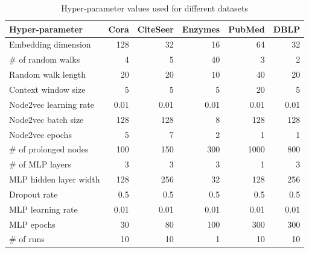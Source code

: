 \begin{table}
  \begin{center}
    \begin{minipage}{330pt} %
      \caption{Hyper-parameter values used for different datasets}
      \label{tab:hyperparameter-values}
      \begin{tabular}{lrrrrr}
        \toprule
        \textbf{Hyper-parameter} & \textbf{Cora} & \textbf{CiteSeer} & \textbf{Enzymes} & \textbf{PubMed} & \textbf{DBLP} \\
        \midrule
        Embedding dimension      & 128           & 32                & 16               & 64              & 32            \\
        \# of random walks       & 4             & 5                 & 40               & 3               & 2             \\
        Random walk length       & 20            & 20                & 10               & 40              & 20            \\
        Context window size      & 5             & 5                 & 5                & 20              & 5             \\
        Node2vec learning rate   & 0.01          & 0.01              & 0.01             & 0.01            & 0.01          \\
        Node2vec batch size      & 128           & 128               & 8                & 128             & 128           \\
        Node2vec epochs          & 5             & 7                 & 2                & 1               & 1             \\
        \# of prolonged nodes    & 100           & 150               & 300              & 1000            & 800           \\
        \# of MLP layers         & 3             & 3                 & 3                & 1               & 3             \\
        MLP hidden layer width   & 128           & 256               & 32               & 128             & 256           \\
        Dropout rate             & 0.5           & 0.5               & 0.5              & 0.5             & 0.5           \\
        MLP learning rate        & 0.01          & 0.01              & 0.01             & 0.01            & 0.01          \\
        MLP epochs               & 30            & 80                & 100              & 300             & 300           \\
        \# of runs               & 10            & 10                & 1                & 10              & 10            \\
        \bottomrule
      \end{tabular}
    \end{minipage}
  \end{center}
\end{table}

